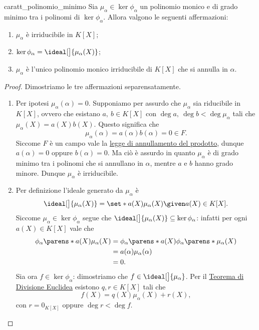\begin{proposition}{caratt_polinomio_minimo}
    Sia $\mu_\alpha \in \ker \phi_\alpha$ un polinomio monico e di grado minimo tra i polinomi di $\ker \phi_\alpha$. Allora valgono le seguenti affermazioni:
    \begin{enumerate}[label={(\roman*)}]
        \item $\mu_\alpha$ è irriducibile in $K[X]$;
        \item $\ker \phi_\alpha = \ideal[\big]{\mu_\alpha(X)}$;
        \item $\mu_\alpha$ è l'unico polinomio monico irriducibile di $K[X]$ che si annulla in $\alpha$.
    \end{enumerate}
\end{proposition}
\begin{proof}
    Dimostriamo le tre affermazioni separensatamente.
    \begin{enumerate}[label={(\roman*)}]
        \item Per ipotesi $\mu_\alpha(\alpha) = 0$. Supponiamo per assurdo che $\mu_\alpha$ sia riducibile in $K[X]$, ovvero che esistano $a,\ b \in K[X]$ con $\deg a,\ \deg b < \deg \mu_\alpha$ tali che $\mu_\alpha(X) = a(X)b(X)$.
        Questo significa che \[
            \mu_\alpha(\alpha) = a(\alpha)b(\alpha) = 0 \in F.
        \] Siccome $F$ è un campo vale la \hyperref[prop:ann_prod_dominio]{legge di annullamento del prodotto}, dunque $a(\alpha) = 0$ oppure $b(\alpha) = 0$. Ma ciò è assurdo in quanto $\mu_\alpha$ è di grado minimo tra i polinomi che si annullano in $\alpha$, mentre $a$ e $b$ hanno grado minore. Dunque $\mu_\alpha$ è irriducibile.
        \item Per definizione l'ideale generato da $\mu_\alpha$ è \[
            \ideal[\big]{\mu_\alpha(X)} = \set*{a(X)\mu_\alpha(X) \given a(X) \in K[X].} 
        \] Siccome $\mu_\alpha \in \ker \phi_\alpha$ segue che $\ideal[\big]{\mu_\alpha(X)} \subseteq \ker \phi_\alpha$: infatti per ogni $a(X) \in K[X]$ vale che \begin{align*}
            \phi_\alpha\parens*{a(X)\mu_\alpha(X)} &= \phi_\alpha\parens*{a(X)}\phi_\alpha\parens*{\mu_\alpha(X)}\\
            &= a(\alpha)\mu_\alpha(\alpha)\\
            &= 0.
        \end{align*}
        Sia ora $f \in \ker \phi_\alpha$: dimostriamo che $f \in \ideal[\big]{\mu_\alpha}$. Per il \hyperref[th:divisione_euclidea_KX]{Teorema di Divisione Euclidea} esistono $q, r \in K[X]$ tali che \[
            f(X) = q(X)\mu_\alpha(X) + r(X),
        \] con $r = 0_{K[X]}$ oppure $\deg r < \deg f$.


\end{enumerate}
\end{proof}
